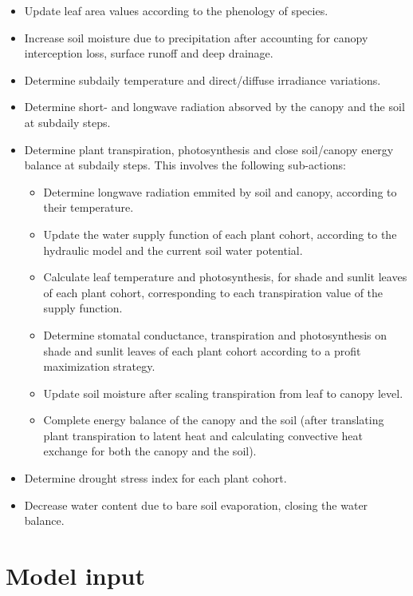 \documentclass[]{book}
\providecommand{\tightlist}{%
  \setlength{\itemsep}{0pt}\setlength{\parskip}{0pt}}
\begin{document}
\begin{itemize}
\tightlist
\item
  Update leaf area values according to the phenology of species.
\item
  Increase soil moisture due to precipitation after accounting for canopy interception loss, surface runoff and deep drainage.
\item
  Determine subdaily temperature and direct/diffuse irradiance variations.
\item
  Determine short- and longwave radiation absorved by the canopy and the soil at subdaily steps.
\item
  Determine plant transpiration, photosynthesis and close soil/canopy energy balance at subdaily steps. This involves the following sub-actions:

  \begin{itemize}
  \tightlist
  \item
    Determine longwave radiation emmited by soil and canopy, according to their temperature.
  \item
    Update the water supply function of each plant cohort, according to the hydraulic model and the current soil water potential.
  \item
    Calculate leaf temperature and photosynthesis, for shade and sunlit leaves of each plant cohort, corresponding to each transpiration value of the supply function.
  \item
    Determine stomatal conductance, transpiration and photosynthesis on shade and sunlit leaves of each plant cohort according to a profit maximization strategy.
  \item
    Update soil moisture after scaling transpiration from leaf to canopy level.
  \item
    Complete energy balance of the canopy and the soil (after translating plant transpiration to latent heat and calculating convective heat exchange for both the canopy and the soil).
  \end{itemize}
\item
  Determine drought stress index for each plant cohort.
\item
  Decrease water content due to bare soil evaporation, closing the water balance.
\end{itemize}

\hypertarget{model-input-1}{%
\section{Model input}\label{model-input-1}}
\end{document}
